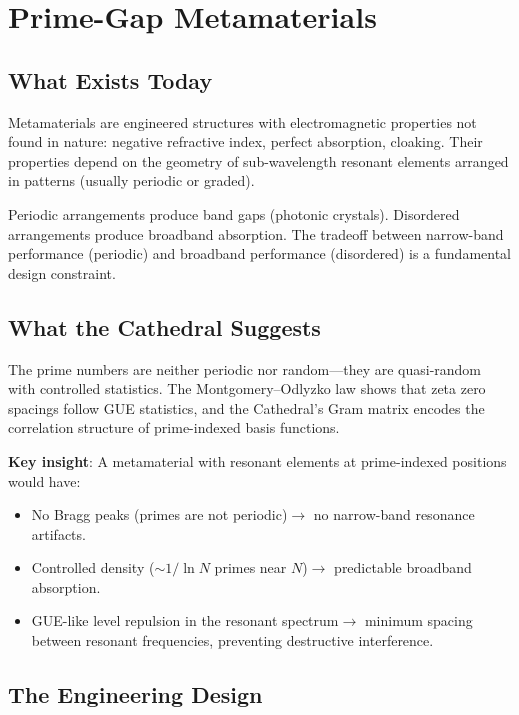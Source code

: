 \documentclass[11pt,a4paper]{article}
\begin{document}
\section{Prime-Gap Metamaterials}
\label{sec:metamaterials}

\subsection{What Exists Today}

Metamaterials are engineered structures with electromagnetic
properties not found in nature: negative refractive index, perfect
absorption, cloaking. Their properties depend on the geometry of
sub-wavelength resonant elements arranged in patterns (usually
periodic or graded).

Periodic arrangements produce band gaps (photonic crystals).
Disordered arrangements produce broadband absorption. The tradeoff
between narrow-band performance (periodic) and broadband performance
(disordered) is a fundamental design constraint.

\subsection{What the Cathedral Suggests}

The prime numbers are neither periodic nor random---they are
quasi-random with controlled statistics. The Montgomery--Odlyzko
law shows that zeta zero spacings follow GUE statistics, and the
Cathedral's Gram matrix encodes the correlation structure of
prime-indexed basis functions.

\textbf{Key insight}: A metamaterial with resonant elements at
prime-indexed positions would have:
\begin{itemize}
  \item No Bragg peaks (primes are not periodic)$\to$ no
    narrow-band resonance artifacts.
  \item Controlled density ($\sim 1/\ln N$ primes near $N$)$\to$
    predictable broadband absorption.
  \item GUE-like level repulsion in the resonant spectrum$\to$
    minimum spacing between resonant frequencies, preventing
    destructive interference.
\end{itemize}

\subsection{The Engineering Design}
\end{document}
